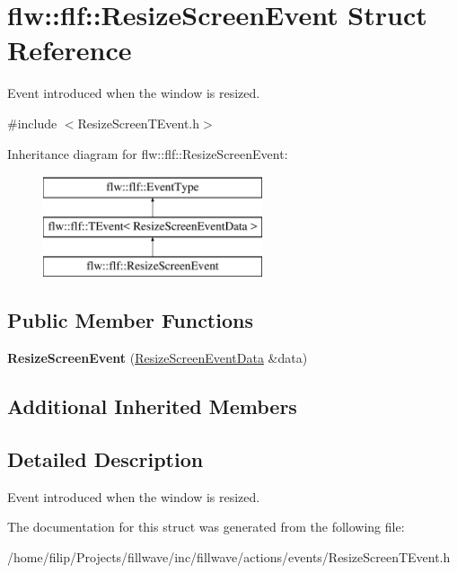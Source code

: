 \hypertarget{classflw_1_1flf_1_1ResizeScreenEvent}{}\section{flw\+:\+:flf\+:\+:Resize\+Screen\+Event Struct Reference}
\label{classflw_1_1flf_1_1ResizeScreenEvent}


Event introduced when the window is resized.  




{\ttfamily \#include $<$Resize\+Screen\+T\+Event.\+h$>$}

Inheritance diagram for flw\+:\+:flf\+:\+:Resize\+Screen\+Event\+:\begin{figure}[H]
\begin{center}
\leavevmode
\includegraphics[height=3.000000cm]{classflw_1_1flf_1_1ResizeScreenEvent}
\end{center}
\end{figure}
\subsection*{Public Member Functions}
\begin{DoxyCompactItemize}
\item 
{\bfseries Resize\+Screen\+Event} (\hyperlink{structflw_1_1flf_1_1ResizeScreenEventData}{Resize\+Screen\+Event\+Data} \&data)\hypertarget{classflw_1_1flf_1_1ResizeScreenEvent_a8b4418c94051fecf0b3dd07671745cd2}{}\label{classflw_1_1flf_1_1ResizeScreenEvent_a8b4418c94051fecf0b3dd07671745cd2}

\end{DoxyCompactItemize}
\subsection*{Additional Inherited Members}


\subsection{Detailed Description}
Event introduced when the window is resized. 

The documentation for this struct was generated from the following file\+:\begin{DoxyCompactItemize}
\item 
/home/filip/\+Projects/fillwave/inc/fillwave/actions/events/Resize\+Screen\+T\+Event.\+h\end{DoxyCompactItemize}
